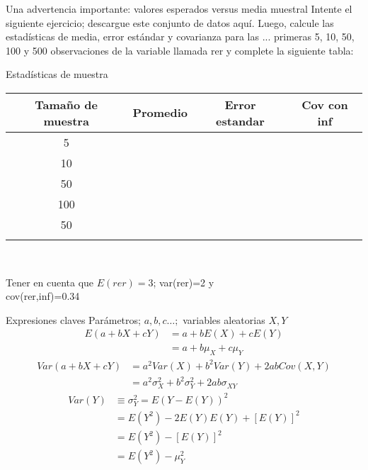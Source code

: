\begin{frame}{Una advertencia importante: valores esperados versus media muestral}
	Intente el siguiente ejercicio; descargue este conjunto de datos aquí. Luego, calcule las estadísticas de media, error estándar y covarianza para las ... primeras 5, 10, 50, 100 y 500 observaciones de la variable llamada rer y complete la siguiente tabla:\\
	\bigskip
	{\small
		\centering
		Estadísticas de muestra\\
		\smallskip
		\begin{tabular}{ cccc } 
			\hline
			Tamaño de muestra & Promedio & Error estandar & Cov con inf \\
			\hline
			5   & & & \\
			10  & & & \\
			50  & & & \\
			100 & & & \\
			50  & & & \\
			\hline
			\\                                                                                                                   
		\end{tabular}\\}
	Tener en cuenta que $E(rer) = 3$; var(rer)=2 y\\
	cov(rer,inf)=0.34
\end{frame}
\begin{frame}{Expresiones claves}
	Parámetros; $a, b, c \ldots;$ variables aleatorias $X, Y$
		\begin{align*}
			E(a+bX+cY) &=a+bE(X)+cE(Y)\\
			&=a+b\mu_{X}+c\mu_{Y}
		\end{align*}
		\begin{align*}
			Var(a+bX+cY) &=a^2Var(X)+b^2Var(Y)+2abCov(X,Y)\\
			&=a^2\sigma_{X}^{2}+b^2\sigma_{Y}^{2}+2ab\sigma_{XY}
		\end{align*}
		\begin{align*}
			Var(Y) & \equiv \sigma_{Y}^{2} = E(Y-E(Y))^2\\
			& = E(Y^2)-2E(Y)E(Y)+[E(Y)]^2\\
			& = E(Y^2) - [E(Y)]^2\\
			& = E(Y^2) - \mu_{Y}^{2}
		\end{align*}
\end{frame}
